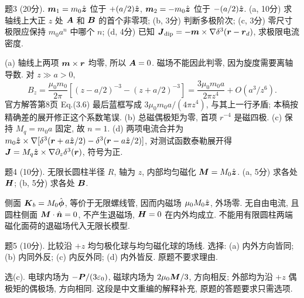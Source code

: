 \begin{exercise}
题3 (20分). $\boldsymbol{m}_1=m_0\hat{\boldsymbol{z}}$ 位于 $+(a/2)\hat{\boldsymbol{z}}$, $\boldsymbol{m}_2=-m_0\hat{\boldsymbol{z}}$ 位于 $-(a/2)\hat{\boldsymbol{z}}$. (a, 10分) 求轴线上大正 $z$ 处 $\boldsymbol{A}$ 和 $\boldsymbol{B}$ 的首个非零项; (b, 3分) 判断多极阶次; (c, 3分) 零尺寸极限应保持 $m_0a^n$ 中哪个 $n$; (d, 4分) 已知 $\boldsymbol{J}_\mathrm{dip}=-\boldsymbol{m}\times\nabla\delta^3(\boldsymbol{r}-\boldsymbol{r}_d)$, 求极限电流密度.
\end{exercise}
\begin{solution}
(a) 轴线上两项 $\boldsymbol{m}\times\boldsymbol{r}$ 均零, 所以 $\boldsymbol{A}=0$. 磁场不能因此判零, 因为旋度需要离轴导数. 对 $z\gg a>0$,
\[
B_z=\frac{\mu_0m_0}{2\pi}\left[(z-a/2)^{-3}-(z+a/2)^{-3}\right]
=\frac{3\mu_0m_0a}{2\pi z^4}+O(a^3/z^6).
\] 官方解答第8页 Eq.(3.6) 最后蓝框写成 $3\mu_0m_0a/(4\pi z^4)$, 与其上一行矛盾; 本稿按精确差的展开修正这个系数笔误.
(b) 总磁偶极矩为零, 首项 $r^{-4}$ 是磁四极. (c) 保持 $M_q=m_0a$ 固定, 故 $n=1$. (d) 两项电流合并为 $m_0\hat{\boldsymbol{z}}\times\nabla[\delta^3(\boldsymbol{r}+a\hat{\boldsymbol{z}}/2)-\delta^3(\boldsymbol{r}-a\hat{\boldsymbol{z}}/2)]$, 对测试函数泰勒展开得 $\boldsymbol{J}=M_q\hat{\boldsymbol{z}}\times\nabla\partial_z\delta^3(\boldsymbol{r})$, 符号为正.
\end{solution}

\begin{exercise}
题4 (10分). 无限长圆柱半径 $R$, 轴为 $z$, 内部均匀磁化 $\boldsymbol{M}=M_0\hat{\boldsymbol{z}}$. (a, 5分) 求各处 $\boldsymbol{H}$; (b, 5分) 求各处 $\boldsymbol{B}$.
\end{exercise}
\begin{solution}
侧面 $\boldsymbol{K}_b=M_0\hat{\boldsymbol{\phi}}$, 等价于无限螺线管, 因而内磁场 $\mu_0M_0\hat{\boldsymbol{z}}$, 外场零. 无自由电流, 且圆柱侧面 $\boldsymbol{M}\cdot\hat{\boldsymbol{n}}=0$, 不产生退磁场, $\boldsymbol{H}=0$ 在内外均成立. 不能用有限圆柱两端磁化面荷的退磁场代入无限长模型.
\end{solution}
\begin{exercise}
题5 (10分). 比较沿 $+z$ 均匀极化球与均匀磁化球的场线. 选择: (a) 内外方向皆同; (b) 内同外反; (c) 内反外同; (d) 内外皆反. 原题不要求理由.
\end{exercise}
\begin{solution}
选(c). 电球内场为 $-\boldsymbol{P}/(3\varepsilon_0)$, 磁球内场为 $2\mu_0\boldsymbol{M}/3$, 方向相反; 外部均为沿 $+z$ 偶极矩的偶极场, 方向相同. 这段是中文重编的解释补充, 原题的答题要求只需选项.
\end{solution}
